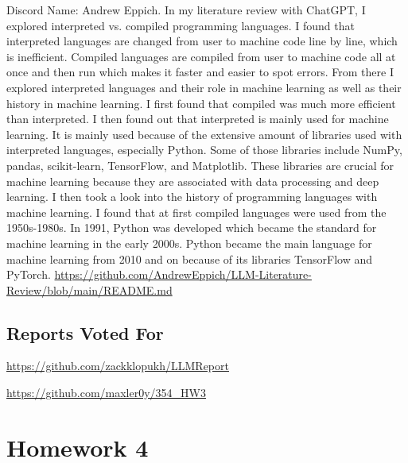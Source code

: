 \documentclass{article}
\theoremstyle{plain}
\theoremstyle{definition}
\theoremstyle{remark}
\begin{document}
Discord Name: Andrew Eppich.   
In my literature review with ChatGPT, I explored interpreted vs. compiled programming languages. I found that interpreted languages are changed from user to machine code line by line, which is inefficient. Compiled languages are compiled from user to machine code all at once and then run which makes it faster and easier to spot errors. From there I explored interpreted languages and their role in machine learning as well as their history in machine learning. I first found that compiled was much more efficient than interpreted. I then found out that interpreted is mainly used for machine learning. It is mainly used because of the extensive amount of libraries used with interpreted languages, especially Python. Some of those libraries include NumPy, pandas, scikit-learn, TensorFlow, and Matplotlib. These libraries are crucial for machine learning because they are associated with data processing and deep learning. I then took a look into the history of programming languages with machine learning. I found that at first compiled languages were used from the 1950s-1980s. In 1991, Python was developed which became the standard for machine learning in the early 2000s. Python became the main language for machine learning from 2010 and on because of its libraries TensorFlow and PyTorch. 
\url{https://github.com/AndrewEppich/LLM-Literature-Review/blob/main/README.md}

\subsection{Reports Voted For}

\url{https://github.com/zackklopukh/LLMReport}

\url{https://github.com/maxler0y/354_HW3}

\section{Homework 4}\label{homework4}
\end{document}
